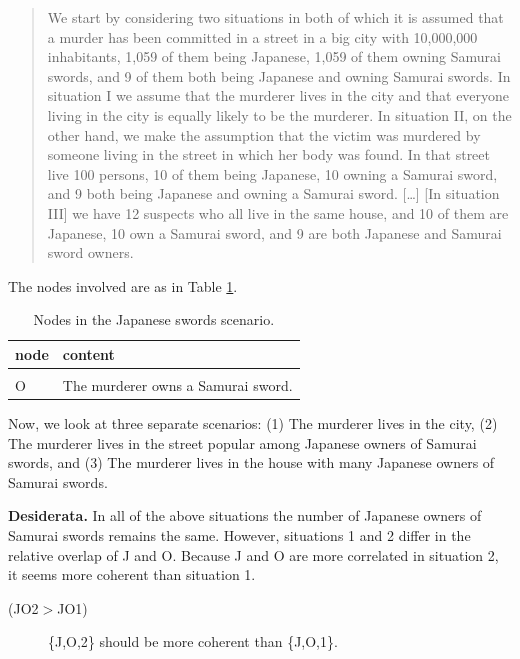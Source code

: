 \documentclass[
  10pt,
]{scrartcl}
\newcommand{\s}[1]{\textsf{#1}}
\begin{document}
\begin{quote}
  We start by considering two situations in both of which it is assumed that a murder has been committed in a street in a big city with 10,000,000 inhabitants, 1,059 of them being Japanese, 1,059 of them owning Samurai swords, and 9 of them both being Japanese and owning Samurai swords. In situation I we assume that the murderer lives in the city and that everyone living in the city is equally likely to be the murderer. In situation II, on the other hand, we make the assumption that the victim was murdered by someone living in the street in which her body was found. In that street live 100 persons, 10 of them being Japanese, 10 owning a Samurai sword, and 9 both being Japanese and owning a Samurai sword. [\dots] [In situation III] we have 12 suspects who all live in the same house, and 10 of them are Japanese, 10 own a Samurai sword, and 9 are both Japanese and Samurai sword owners.
\end{quote}

\noindent The nodes involved are as in Table \ref{tab:japanesePropositions1}.

\begin{table}[H]

\caption{\label{tab:japanesePropositions1}Nodes in the Japanese swords scenario.}
\centering
\begin{tabular}[t]{ll}
\toprule
node & content\\
\midrule
\cellcolor{gray!6}{J} & \cellcolor{gray!6}{The murderer is Japanese.}\\
O & The murderer owns a Samurai sword.\\
\bottomrule
\end{tabular}
\end{table}

Now, we look at three separate scenarios: (\textsf{1}) The murderer lives in the city, (\textsf{2}) The murderer lives in the street popular among Japanese owners of Samurai swords, and (\textsf{3}) The murderer lives in the house with many Japanese owners of Samurai swords.

\noindent \textbf{Desiderata.} In all of the above situations the number of Japanese owners of Samurai swords remains the same. However, situations 1 and 2 differ in the relative overlap of \s{J} and \s{O}. Because \s{J} and \s{O} are more correlated in situation 2, it seems more coherent than situation 1.

\vspace{2mm}\begin{description}
    \item[(\s{JO2}$>$\s{JO1})]  \{\s{J,O,2}\} should be more coherent than \{\s{J,O,1}\}.
\end{description}\vspace{2mm}
\end{document}
